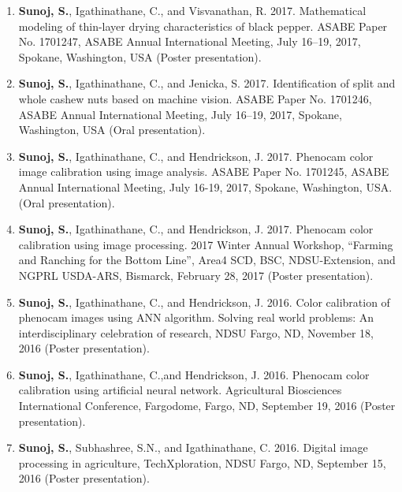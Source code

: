 \documentclass[11pt]{article}
\begin{document}
\begin{enumerate}[itemsep=-2pt]
\item \textbf{Sunoj, S.}, Igathinathane, C., and Visvanathan, R. 2017. Mathematical modeling of thin-layer drying characteristics of black pepper. ASABE Paper No. 1701247, ASABE Annual International Meeting, July 16--19, 2017, Spokane, Washington, USA (Poster presentation).

\item \textbf{Sunoj, S.}, Igathinathane, C., and Jenicka, S. 2017. Identification of split and whole cashew nuts based on machine vision. ASABE Paper No. 1701246, ASABE Annual International Meeting, July 16--19, 2017, Spokane, Washington, USA (Oral presentation).

\item \textbf{Sunoj, S.}, Igathinathane, C., and Hendrickson, J. 2017. Phenocam color image calibration using image analysis. ASABE Paper No. 1701245, ASABE Annual International Meeting, July 16-19, 2017, Spokane, Washington, USA. (Oral presentation).

\item \textbf{Sunoj, S.}, Igathinathane, C., and Hendrickson, J. 2017. Phenocam color calibration using image processing. 2017 Winter Annual Workshop, “Farming and Ranching for the Bottom Line”, Area4 SCD, BSC, NDSU-Extension, and NGPRL USDA-ARS, Bismarck, February 28, 2017 (Poster presentation).


\item \textbf{Sunoj, S.}, Igathinathane, C., and Hendrickson, J. 2016. Color calibration of phenocam images using ANN algorithm. Solving real world problems: An interdisciplinary celebration of research, NDSU Fargo, ND, November 18, 2016 (Poster presentation).

\item \textbf{Sunoj, S.}, Igathinathane, C.,and Hendrickson, J. 2016. Phenocam color calibration using artificial neural network. Agricultural Biosciences International Conference, Fargodome, Fargo, ND, September 19, 2016 (Poster presentation).

\item \textbf{Sunoj, S.}, Subhashree, S.N., and Igathinathane, C. 2016. Digital image processing in agriculture, TechXploration, NDSU Fargo, ND, September 15, 2016 (Poster presentation).


\end{enumerate}
\end{document}
